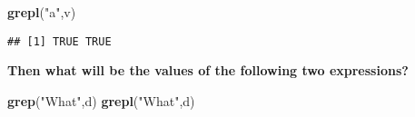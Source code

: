 \documentclass[]{article}
\newenvironment{Shaded}{\begin{snugshade}}{\end{snugshade}}
\newcommand{\KeywordTok}[1]{\textcolor[rgb]{0.13,0.29,0.53}{\textbf{#1}}}
\newcommand{\NormalTok}[1]{#1}
\newcommand{\StringTok}[1]{\textcolor[rgb]{0.31,0.60,0.02}{#1}}
\begin{document}
\begin{Shaded}
\begin{Highlighting}[]
\KeywordTok{grepl}\NormalTok{(}\StringTok{"a"}\NormalTok{,v)}
\end{Highlighting}
\end{Shaded}

\begin{verbatim}
## [1] TRUE TRUE
\end{verbatim}

\textbf{Then what will be the values of the following two expressions?}

\begin{Shaded}
\begin{Highlighting}[]
\KeywordTok{grep}\NormalTok{(}\StringTok{"What"}\NormalTok{,d)}
\KeywordTok{grepl}\NormalTok{(}\StringTok{"What"}\NormalTok{,d)}
\end{Highlighting}
\end{Shaded}
\end{document}
